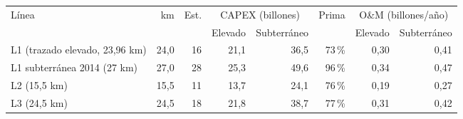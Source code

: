\begin{tabular}{p{4.6cm}rrrrrrr}
\toprule
Línea & km & Est. & \multicolumn{2}{c}{CAPEX (billones)} & Prima & \multicolumn{2}{c}{O\&M (billones/año)} \\
\cmidrule(lr){4-5}\cmidrule(lr){7-8}
 & & & Elevado & Subterráneo & & Elevado & Subterráneo \\
\midrule
L1 (trazado elevado, 23,96 km) & 24,0 & 16 & 21,1 & 36,5 & 73\,\% & 0,30 & 0,41 \\
L1 subterránea 2014 (27 km) & 27,0 & 28 & 25,3 & 49,6 & 96\,\% & 0,34 & 0,47 \\
L2 (15,5 km) & 15,5 & 11 & 13,7 & 24,1 & 76\,\% & 0,19 & 0,27 \\
L3 (24,5 km) & 24,5 & 18 & 21,8 & 38,7 & 77\,\% & 0,31 & 0,42 \\
\bottomrule
\end{tabular}
